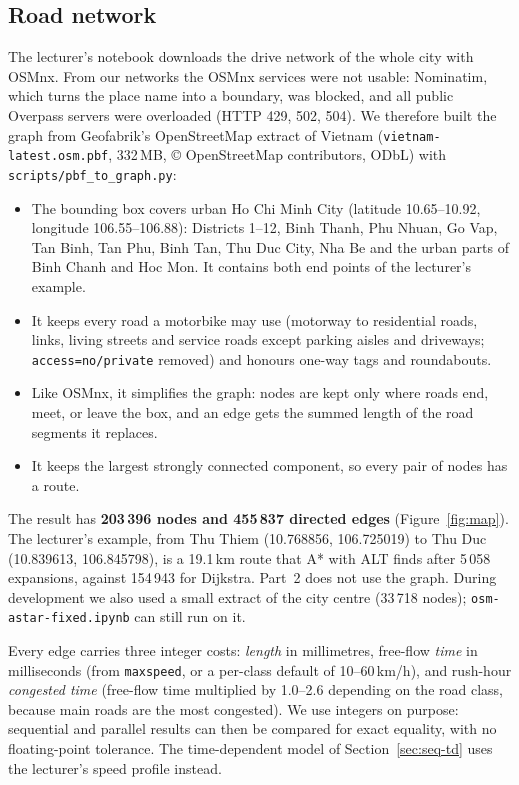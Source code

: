 \subsection{Road network}

The lecturer's notebook downloads the drive network of the whole city with
OSMnx. From our networks the OSMnx services were not usable: Nominatim, which
turns the place name into a boundary, was blocked, and all public Overpass
servers were overloaded (HTTP 429, 502, 504). We therefore built the graph
from Geofabrik's OpenStreetMap extract of Vietnam (\texttt{vietnam-latest.osm.pbf},
332\,MB, \copyright{} OpenStreetMap contributors, ODbL) with
\texttt{scripts/pbf\_to\_graph.py}:

\begin{itemize}[nosep]
  \item The bounding box covers urban Ho Chi Minh City (latitude 10.65--10.92,
        longitude 106.55--106.88): Districts 1--12, Binh Thanh, Phu Nhuan, Go
        Vap, Tan Binh, Tan Phu, Binh Tan, Thu Duc City, Nha Be and the urban
        parts of Binh Chanh and Hoc Mon. It contains both end points of the
        lecturer's example.
  \item It keeps every road a motorbike may use (motorway to residential
        roads, links, living streets and service roads except parking aisles
        and driveways; \texttt{access=no/private} removed) and honours one-way
        tags and roundabouts.
  \item Like OSMnx, it simplifies the graph: nodes are kept only where roads
        end, meet, or leave the box, and an edge gets the summed length of the
        road segments it replaces.
  \item It keeps the largest strongly connected component, so every pair of
        nodes has a route.
\end{itemize}

The result has \textbf{203\,396 nodes and 455\,837 directed edges}
(Figure~\ref{fig:map}). The lecturer's example, from Thu Thiem
(10.768856, 106.725019) to Thu Duc (10.839613, 106.845798), is a 19.1\,km
route that A* with ALT finds after 5\,058 expansions, against 154\,943 for
Dijkstra. Part~2 does not use the graph. During development we also used a
small extract of the city centre (33\,718 nodes); \texttt{osm-astar-fixed.ipynb}
can still run on it.

Every edge carries three integer costs: \emph{length} in millimetres,
free-flow \emph{time} in milliseconds (from \texttt{maxspeed}, or a per-class
default of 10--60\,km/h), and rush-hour \emph{congested time} (free-flow time
multiplied by 1.0--2.6 depending on the road class, because main roads are the
most congested). We use integers on purpose: sequential and parallel results
can then be compared for exact equality, with no floating-point tolerance.
The time-dependent model of Section~\ref{sec:seq-td} uses the lecturer's speed
profile instead.


